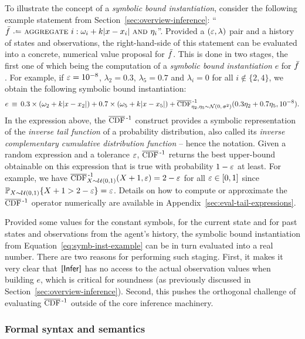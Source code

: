 \documentclass[acmsmall,screen,nonacm]{acmart}
\begin{document}
To illustrate the concept of a \emph{symbolic bound instantiation}, consider the following example statement from Section~\ref{sec:overview-inference}: ``$\TrainFxMax \slassign \slaggregate i: \omega_i + k|x - x_i| \sland \eta_i$''. Provided a $(\varepsilon, \lambda)$ pair and a history of states and observations, the right-hand-side of this statement can be evaluated into a concrete, numerical value proposal for $\bar {f}$. This is done in two stages, the first one of which being the computation of a \emph{symbolic bound instantiation} $e$ for $\bar {f}$. For example, if $\varepsilon=10^{-8}$, $\lambda_2 = 0.3$, $\lambda_5 = 0.7$ and $\lambda_i = 0$ for all $i \notin \{2, 4\}$, we obtain the following symbolic bound instantiation:
\begin{equation}\label{eq:symb-inst-example}
  e \,\equiv\, 0.3 \times (\omega_2 + k|x-x_2|) + 0.7 \times (\omega_5 + k|x-x_5|) + \InvCCDFwith{\eta_2,\eta_5 \sim \slnormal(0, \,\sigma^2)}(0.3 \eta_2+0.7\eta_5, 10^{-8}).
\end{equation}
In the expression above, the $\InvCCDF$ construct provides a symbolic representation of the \emph{inverse tail function} of a probability distribution, also called its \emph{inverse complementary cumulative distribution function} -- hence the notation. Given a random expression and a tolerance $\varepsilon$, $\InvCCDF$ returns the best upper-bound obtainable on this expression that is true with probability $1-\varepsilon$ at least. For example, we have $\InvCCDFwith{X \sim \sluniform(0, 1)}(X + 1, \Eps) = 2 - \Eps$ for all $\varepsilon \in [0, 1]$ since $\mathbb{P}_{X \sim \mathcal{U}(0, 1)}\{X + 1 > 2 - \varepsilon\} = \varepsilon$. Details on how to compute or approximate the $\InvCCDF$ operator numerically are available in Appendix~\ref{sec:eval-tail-expressions}.

Provided some values for the constant symbols, for the current state and for past states and observations from the agent's history, the symbolic bound instantiation from Equation~\ref{eq:symb-inst-example} can be in turn evaluated into a real number. There are two reasons for performing such staging. First, it makes it very clear that $\sem{\Inference}$ has no access to the actual observation values when building $e$, which is critical for soundness (as previously discussed in Section~\ref{sec:overview-inference}). Second, this pushes the orthogonal challenge of evaluating $\InvCCDF$ outside of the core inference machinery.

\subsubsection{Formal syntax and semantics}
\end{document}
